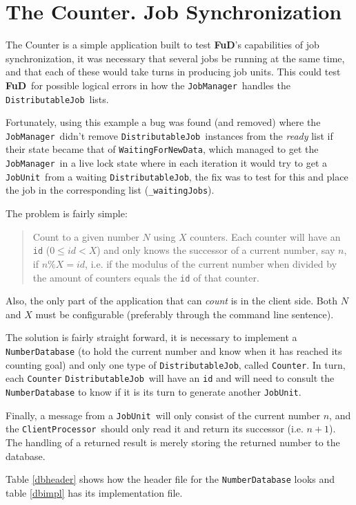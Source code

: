 \documentclass[a4paper,12pt,english]{report}
\newcommand{\fud}{\textbf{FuD}}
\renewcommand{\DJ}{\texttt{DistributableJob}}
\newcommand{\JU}{\texttt{JobUnit}}
\newcommand{\CP}{\texttt{ClientProcessor}}
\newcommand{\JM}{\texttt{JobManager}}
\begin{document}
\section{The Counter. Job Synchronization}

The Counter is a simple application built to test \fud's capabilities of job synchronization, it was necessary that several jobs be running at the same time, and that each of these would take turns in producing job units. This could test \fud \ for possible logical errors in how the \JM \ handles the \DJ \ lists. 

Fortunately, using this example a bug was found (and removed) where the \JM \ didn't remove \DJ \ instances from the \emph{ready} list if their state became that of \texttt{WaitingForNewData}, which managed to get the \JM \ in a live lock state where in each iteration it would try to get a \JU \ from a waiting \DJ, the fix was to test for this and place the job in the corresponding list (\texttt{\_waitingJobs}).

The problem is fairly simple:
\begin{quote}
Count to a given number $N$ using $X$ counters. Each counter will have an \texttt{id} ($0\leq id < X$) and only knows the successor of a current number, say $n$, if $n \% X = id$, i.e. if the modulus of the current number when divided by the amount of counters equals the \texttt{id} of that counter.
\end{quote}

Also, the only part of the application that can \emph{count} is in the client side. Both $N$ and $X$ must be configurable (preferably through the command line sentence).

The solution is fairly straight forward, it is necessary to implement a \texttt{NumberDatabase} (to hold the current number and know when it has reached its counting goal) and only one type of \DJ, called \texttt{Counter}. In turn, each \texttt{Counter} \DJ \ will have an \texttt{id} and will need to consult the \texttt{NumberDatabase} to know if it is its turn to generate another \JU.

Finally, a message from a \JU \ will only consist of the current number $n$, and the \CP \ should only read it and return its successor (i.e. $n + 1$). The handling of a returned result is merely storing the returned number to the database.

Table \ref{dbheader} shows how the header file for the \texttt{NumberDatabase} looks and table \ref{dbimpl} has its implementation file. 
\end{document}
